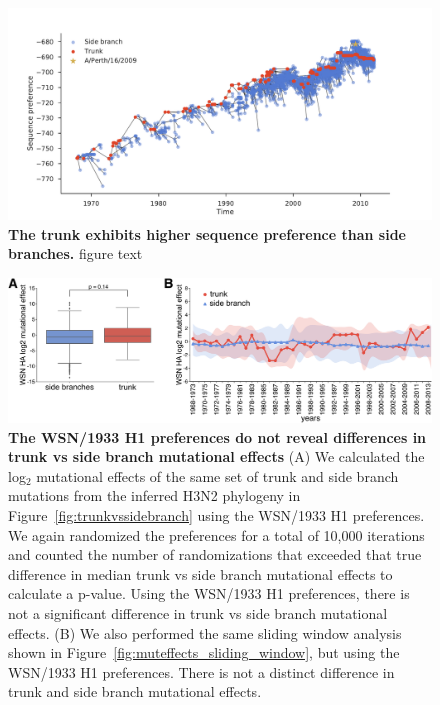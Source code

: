\documentclass[11pt]{article}
\begin{document}
\begin{figure}
\centerline{\includegraphics[width=\textwidth]{figs/sequence_preference/sequence_preference.pdf}}
\caption{\label{fig:sequence_preference}
{\bf The trunk exhibits higher sequence preference than side branches.}
figure text
}
\end{figure}

\begin{figure}
\centerline{\includegraphics[width=\textwidth]{figs/WSN_trunkvssidebranch/WSN_trunkvssidebranch.pdf}}
\caption{\label{fig:WSN_trunkvssidebranch}
{\bf The WSN/1933 H1 preferences do not reveal differences in trunk vs side branch mutational effects}
(A) We calculated the log$_{2}$ mutational effects of the same set of trunk and side branch mutations from the inferred H3N2 phylogeny in Figure~\ref{fig:trunkvssidebranch} using the WSN/1933 H1 preferences.
We again randomized the preferences for a total of 10,000 iterations and counted the number of randomizations that exceeded that true difference in median trunk vs side branch mutational effects to calculate a p-value.
Using the WSN/1933 H1 preferences, there is not a significant difference in trunk vs side branch mutational effects.
(B) We also performed the same sliding window analysis shown in Figure~\ref{fig:muteffects_sliding_window}, but using the WSN/1933 H1 preferences.
There is not a distinct difference in trunk and side branch mutational effects.
}
\end{figure}
\end{document}
